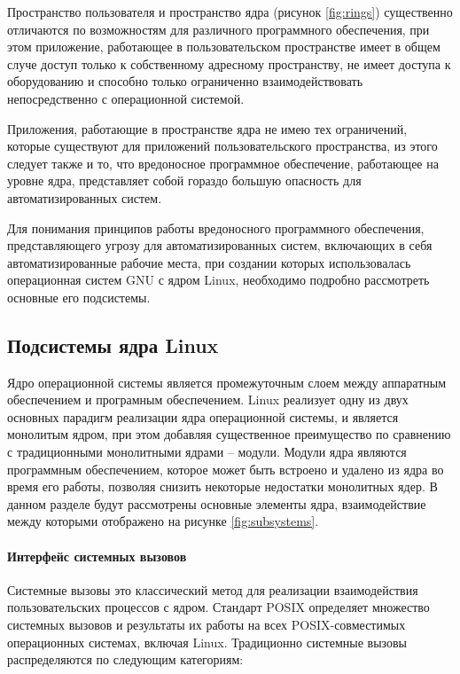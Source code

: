 \documentclass{gost7.32-2001}
\begin{document}

Пространство пользователя и пространство ядра (рисунок
\ref{fig:rings}) существенно отличаются по возможностям для различного
программного обеспечения, при этом приложение, работающее в
пользовательском пространстве имеет в общем случе доступ только к
собственному адресному пространству, не имеет доступа к оборудованию и
способно только ограниченно взаимодействовать непосредственно с
операционной системой.

Приложения, работающие в пространстве ядра не имею тех ограничений,
которые существуют для приложений пользовательского пространства, из
этого следует также и то, что вредоносное программное обеспечение,
работающее на уровне ядра, представляет собой гораздо большую
опасность для автоматизированных систем.

Для понимания принципов работы вредоносного программного обеспечения,
представляющего угрозу для автоматизированных систем, включающих в
себя автоматизированные рабочие места, при создании которых
использовалась операционная систем GNU с ядром Linux, необходимо
подробно рассмотреть основные его подсистемы.

\subsection{Подсистемы ядра Linux}
Ядро операционной системы является промежуточным слоем между
аппаратным обеспечением и програмным обеспечением. Linux реализует
одну из двух основных парадигм реализации ядра операционной системы, и
является монолитым ядром, при этом добавляя существенное преимущество
по сравнению с традиционными монолитными ядрами – модули. Модули ядра
являются программным обеспечением, которое может быть встроено и
удалено из ядра во время его работы, позволяя снизить некоторые
недостатки монолитных ядер.  В данном разделе будут рассмотрены
основные элементы ядра, взаимодействие между которыми отображено на
рисунке \ref{fig:subsystems}.


\paragraph{Интерфейс системных вызовов}
Системные вызовы это классический метод для реализации взаимодействия
пользовательских процессов с ядром. Стандарт POSIX определяет
множество системных вызовов и результаты их работы на всех
POSIX-совместимых операционных системах, включая Linux. Традиционно
системные вызовы распределяются по следующим категориям:
\end{document}
